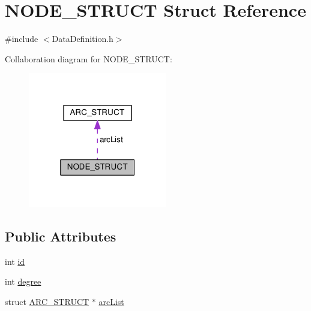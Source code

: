 \hypertarget{structNODE__STRUCT}{\section{N\-O\-D\-E\-\_\-\-S\-T\-R\-U\-C\-T Struct Reference}
\label{structNODE__STRUCT}
}


{\ttfamily \#include $<$Data\-Definition.\-h$>$}



Collaboration diagram for N\-O\-D\-E\-\_\-\-S\-T\-R\-U\-C\-T\-:
\nopagebreak
\begin{figure}[H]
\begin{center}
\leavevmode
\includegraphics[width=172pt]{structNODE__STRUCT__coll__graph}
\end{center}
\end{figure}
\subsection*{Public Attributes}
\begin{DoxyCompactItemize}
\item 
int \hyperlink{structNODE__STRUCT_a4386a981b07860b03b46d11c5280445d}{id}
\item 
int \hyperlink{structNODE__STRUCT_a4d119525d60341ec5fb1c0f040adb867}{degree}
\item 
struct \hyperlink{structARC__STRUCT}{A\-R\-C\-\_\-\-S\-T\-R\-U\-C\-T} $\ast$ \hyperlink{structNODE__STRUCT_a0a9adf25cd6c875ce28817790e2d93f7}{arc\-List}
\end{DoxyCompactItemize}


